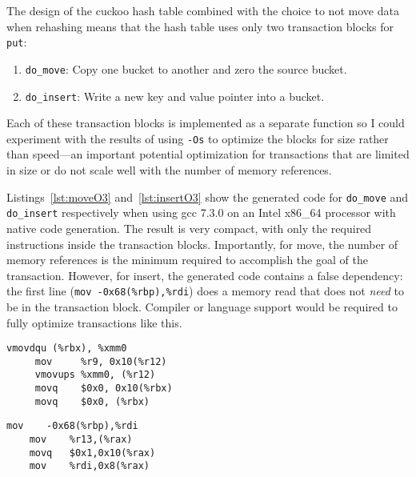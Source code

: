 The design of the cuckoo hash table combined with the choice to not move data
when rehashing means that the hash table uses only two transaction blocks for
\texttt{put}:
\begin{enumerate}
\item \texttt{do\_move}: Copy one bucket to another and zero the source bucket.
\item \texttt{do\_insert}: Write a new key and value pointer into a bucket.
\end{enumerate}
Each of these transaction blocks is implemented as a separate function so I
could experiment with the results of using \texttt{-Os} to optimize the blocks
for size rather than speed---an important potential optimization for
transactions that are limited in size or do not scale well with the number of
memory references.

Listings~\ref{lst:moveO3} and~\ref{lst:insertO3} show the generated code for
\texttt{do\_move} and \texttt{do\_insert} respectively when using gcc 7.3.0 on
an Intel x86\_64 processor with native code generation. The result is very
compact, with only the required instructions inside the transaction blocks.
Importantly, for move, the number of memory references is the minimum required to
accomplish the goal of the transaction. However, for insert, the generated code
contains a false dependency: the first line (\texttt{mov -0x68(\%rbp),\%rdi})
does a memory read that does not \textit{need} to be in the transaction block.
Compiler or language support would be required to fully optimize transactions
like this.


\begin{lstlisting}[caption={Transaction code, do\_move, optimized for speed.
Five instructions, five memory accesses (four writes).},label={lst:moveO3}]
     vmovdqu (%rbx), %xmm0
     mov     %r9, 0x10(%r12)
     vmovups %xmm0, (%r12)
     movq    $0x0, 0x10(%rbx)
     movq    $0x0, (%rbx)
\end{lstlisting}

\begin{lstlisting}[caption={Transaction code, do\_insert, optimized for speed.
Four instructions, four memory accesses (three writes).},label=lst:insertO3]
    mov    -0x68(%rbp),%rdi
    mov    %r13,(%rax)
    movq   $0x1,0x10(%rax)
    mov    %rdi,0x8(%rax)
\end{lstlisting}


